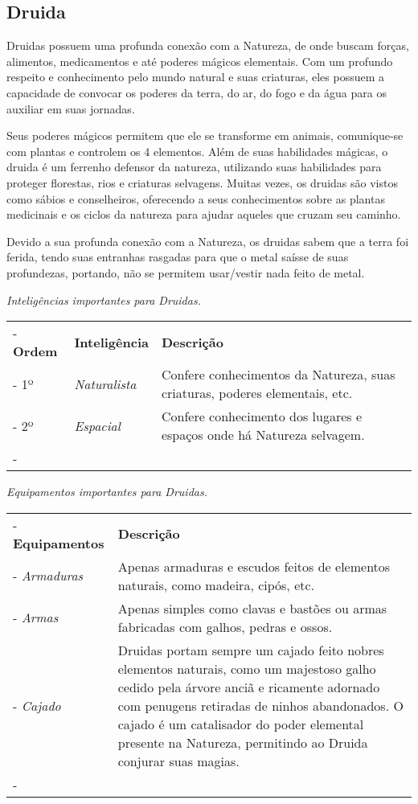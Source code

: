 \subsection*{Druida}
Druidas possuem uma profunda conexão com a Natureza, de onde buscam forças, alimentos, medicamentos e até poderes mágicos elementais. Com um profundo respeito e conhecimento pelo mundo natural e suas criaturas, eles possuem a capacidade de convocar os poderes da terra, do ar, do fogo e da água para os auxiliar em suas jornadas. 

Seus poderes mágicos permitem que ele se transforme em animais, comunique-se com plantas e controlem os 4 elementos. Além de suas habilidades mágicas, o druida é um ferrenho defensor da natureza, utilizando suas habilidades para proteger florestas, rios e criaturas selvagens. Muitas vezes, os druidas são vistos como sábios e conselheiros, oferecendo a seus conhecimentos sobre as plantas medicinais e os ciclos da natureza para ajudar aqueles que cruzam seu caminho.

Devido a sua profunda conexão com a Natureza, os druidas sabem que a terra foi ferida, tendo suas entranhas rasgadas para que o metal saísse de suas profundezas, portando, não se permitem usar/vestir nada feito de metal.

\begin{table}[htb]
	\centering\smaller
	\emph{Inteligências importantes para Druidas.} \\
	\begin{tabu} to \textwidth {|X[c 0.5]|X[1]|X[3]|} \tabucline-
		\textbf{Ordem}	& \textbf{Inteligência}	&	\textbf{Descrição}	\\ \tabucline-
		1º		& \emph{Naturalista}  	& Confere conhecimentos da Natureza, suas criaturas, poderes elementais, etc. 	\\ \tabucline-
		2º		& \emph{Espacial} & Confere conhecimento dos lugares e espaços onde há Natureza selvagem. \\ \tabucline-
	\end{tabu}
\end{table}

\begin{table}[htb]
	\centering\smaller
	\emph{Equipamentos importantes para Druidas.}
	\begin{tabu} to \textwidth {|X[0.5]|X[3]|} \tabucline-
		\textbf{Equipamentos}	&	\textbf{Descrição}	\\ \tabucline-
		\emph{Armaduras} & Apenas armaduras e escudos feitos de elementos naturais, como madeira, cipós, etc.	\\ \tabucline-
		\emph{Armas} & Apenas simples como clavas e bastões ou armas fabricadas com galhos, pedras e ossos. \\ \tabucline-
		\emph{Cajado} & Druidas portam sempre um cajado feito nobres elementos naturais, como um majestoso galho cedido pela árvore anciã e ricamente adornado com penugens retiradas de ninhos abandonados. O cajado é um catalisador do poder elemental presente na Natureza, permitindo ao Druida conjurar suas magias. \\ \tabucline-
	\end{tabu}
\end{table}

